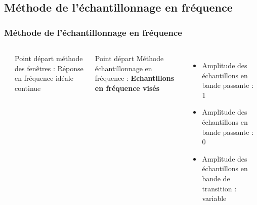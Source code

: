 \documentclass{beamer}
\begin{document}
\subsection{Méthode de l'échantillonnage en fréquence}
\begin{frame}
\frametitle{Méthode de l'échantillonnage en fréquence}
\begin{columns}
\column{60mm}
\begin{center}
\end{center}

\column{60mm}
Point départ méthode des fenêtres : Réponse en fréquence idéale continue \\

\vspace{0.5cm}

Point départ Méthode échantillonnage en fréquence : \textbf{Echantillons en fréquence visés}\\
\vspace{0.2cm}
\begin{itemize}
\item<2-> Amplitude des échantillons en bande passante : 1
\vspace{0.2cm} 
\item<3-> Amplitude des échantillons en bande passante : 0
\vspace{0.2cm} 
\item<4-> Amplitude des échantillons en bande de transition : variable
\end{itemize}

\end{columns}

\end{frame}
\end{document}
